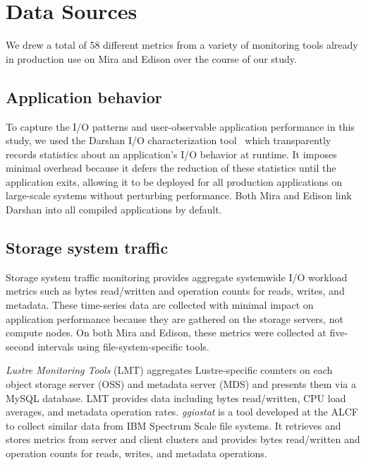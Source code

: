 


\section{Data Sources} \label{sec:methods}

We drew a total of 58 different metrics from a variety
of monitoring tools already in production use on Mira and Edison over the
course of our study.

\subsection{Application behavior} \label{sec:methods/darshan}

To capture the I/O patterns and user-observable application performance in this study, we used the Darshan I/O characterization tool~\cite{carns200924} which transparently records statistics about an application's I/O behavior at runtime.
It imposes minimal overhead because it defers the reduction of these statistics until the application exits,
allowing it to be deployed for all production applications on large-scale systems without perturbing performance.  Both Mira and Edison link Darshan into all compiled applications by default.

\subsection{Storage system traffic} \label{sec:methods/storagesystraffic}

Storage system traffic monitoring provides aggregate systemwide I/O workload metrics such as bytes read/written and operation counts for reads, writes, and metadata.
These time-series data are collected with minimal impact on application performance because they are gathered on the storage servers, not compute nodes.
On both Mira and Edison, these metrics were collected at five-second intervals using file-system-specific tools.  

\emph{Lustre Monitoring Tools} (LMT) aggregates Lustre-specific counters on each object storage server (OSS) and metadata server (MDS) and presents them via a MySQL database.
LMT provides data including bytes read/written, CPU load averages, and metadata operation rates.
\emph{ggiostat} is a tool developed at the ALCF to collect similar data from IBM Spectrum Scale file systems.
It retrieves and stores metrics from server and client clusters and provides bytes read/written and operation counts for reads, writes, and metadata operations.

